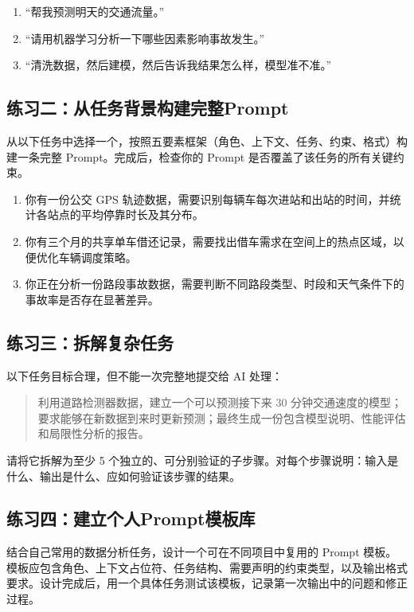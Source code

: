 \begin{enumerate}
  \item“帮我预测明天的交通流量。”
  \item“请用机器学习分析一下哪些因素影响事故发生。”
  \item“清洗数据，然后建模，然后告诉我结果怎么样，模型准不准。”
\end{enumerate}

\subsection*{练习二：从任务背景构建完整Prompt}

从以下任务中选择一个，按照五要素框架（角色、上下文、任务、约束、格式）构建一条完整 Prompt。完成后，检查你的 Prompt 是否覆盖了该任务的所有关键约束。

\begin{enumerate}
  \item 你有一份公交 GPS 轨迹数据，需要识别每辆车每次进站和出站的时间，并统计各站点的平均停靠时长及其分布。
  \item 你有三个月的共享单车借还记录，需要找出借车需求在空间上的热点区域，以便优化车辆调度策略。
  \item 你正在分析一份路段事故数据，需要判断不同路段类型、时段和天气条件下的事故率是否存在显著差异。
\end{enumerate}

\subsection*{练习三：拆解复杂任务}

以下任务目标合理，但不能一次完整地提交给 AI 处理：

\begin{quote}
利用道路检测器数据，建立一个可以预测接下来 30 分钟交通速度的模型；要求能够在新数据到来时更新预测；最终生成一份包含模型说明、性能评估和局限性分析的报告。
\end{quote}

请将它拆解为至少 5 个独立的、可分别验证的子步骤。对每个步骤说明：输入是什么、输出是什么、应如何验证该步骤的结果。

\subsection*{练习四：建立个人Prompt模板库}

结合自己常用的数据分析任务，设计一个可在不同项目中复用的 Prompt 模板。模板应包含角色、上下文占位符、任务结构、需要声明的约束类型，以及输出格式要求。设计完成后，用一个具体任务测试该模板，记录第一次输出中的问题和修正过程。





